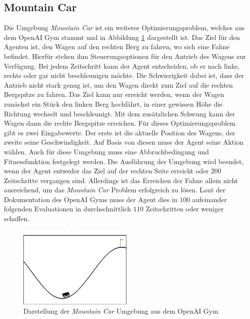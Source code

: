\subsection{Mountain Car}
\label{subsec:analysis_mountain_car}
Die Umgebung \emph{Mountain Car} ist ein weiteres Optimierungsproblem, welches aus dem OpenAI Gym stammt und in Abbildung \ref{fig:mountain_car_env} dargestellt ist. Das Ziel für den Agenten ist, den Wagen auf den rechten Berg zu fahren, wo sich eine Fahne befindet. Hierfür stehen ihm Steuerungsoptionen für den Antrieb des Wagens zur Verfügung. Bei jedem Zeitschritt kann der Agent entscheiden, ob er nach links, rechts oder gar nicht beschleunigen möchte. Die Schwierigkeit dabei ist, dass der Antrieb nicht stark genug ist, um den Wagen direkt zum Ziel auf die rechten Bergspitze zu fahren. Das Ziel kann nur erreicht werden, wenn der Wagen zunächst ein Stück den linken Berg hochfährt, in einer gewissen Höhe die Richtung wechselt und beschleunigt. Mit dem zusätzlichen Schwung kann der Wagen dann die rechte Bergspitze erreichen. Für dieses Optimierungsproblem gibt es zwei Eingabewerte. Der erste ist die aktuelle Position des Wagens, der zweite seine Geschwindigkeit. Auf Basis von diesen muss der Agent seine Aktion wählen. Auch für diese Umgebung muss eine Abbruchbedingung und Fitnessfunktion festgelegt werden. Die Ausführung der Umgebung wird beendet, wenn der Agent entweder das Ziel auf der rechten Seite erreicht oder $200$ Zeitschritte vergangen sind. Allerdings ist das Erreichen der Fahne allein nicht ausreichend, um das \emph{Mountain Car} Problem erfolgreich zu lösen. Laut der Dokumentation des OpenAI Gyms muss der Agent dies in $100$ aufeinander folgenden Evaluationen in durchschnittlich $110$ Zeitschritten oder weniger schaffen.
\begin{figure}[!h]
	\centering
	\includegraphics[width=0.5\textwidth]{./img/mountain_car_env.JPG} 
	\caption{Darstellung der \emph{Mountain Car} Umgebung aus dem OpenAI Gym}
	\label{fig:mountain_car_env}
\end{figure} 
\\\\
